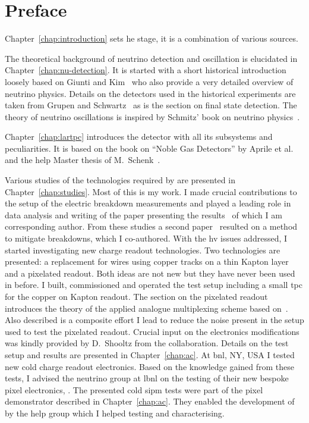 \renewcommand{\Chapter}{{Preface}}
\chapter*{\Chapter}
\chaptermark{\Chapter}


Chapter~\ref{chap:introduction} sets he stage, it is a combination of various sources.

The theoretical background of neutrino detection and oscillation is elucidated in Chapter~\ref{chap:nu-detection}.
It is started with a short historical introduction loosely based on Giunti and Kim~\cite{giunti} who also provide a very detailed overview of neutrino physics.
Details on the detectors used in the historical experiments are taken from Grupen and Schwartz~\cite{grupen} as is the section on final state detection.
The theory of neutrino oscillations is inspired by Schmitz' book on neutrino physics~\cite{schmitz}.

Chapter~\ref{chap:lartpc} introduces the \lartpc{} detector with all its subsystems and peculiarities.
It is based on the book on ``Noble Gas Detectors'' by Aprile et al.~\cite{NobleGasDetectors} and the \gls{help} Master thesis of M.\ Schenk~\cite{michu}.

Various studies of the technologies required by \AC{} are presented in Chapter~\ref{chap:studies}.
Most of this is my work.
I made crucial contributions to the setup of the electric breakdown measurements and played a leading role in data analysis and writing of the paper presenting the results~\cite{breakdown_16} of which I am corresponding author.
From these studies a second paper~\cite{latex} resulted on a method to mitigate breakdowns, which I co-authored.
With the \gls{hv} issues addressed, I started investigating new charge readout technologies.
Two technologies are presented: a replacement for wires using copper tracks on a thin Kapton layer and a pixelated readout.
Both ideas are not new but they have never been used in \lar{} before.
I built, commissioned and operated the test setup including a small \gls{tpc} for the copper on Kapton readout.
The section on the pixelated readout introduces the theory of the applied analogue multiplexing scheme based on~\cite{maplesyrup}.
Also described is a composite effort I lead to reduce the noise present in the setup used to test the pixelated readout.
Crucial input on the electronics modifications was kindly provided by D.\ Shooltz from the \lariat{} collaboration.
Details on the test setup and results are presented in Chapter~\ref{chap:ac}.
At \gls{bnl}, NY, USA I tested new cold charge readout electronics.
Based on the knowledge gained from these tests, I advised the neutrino group at \gls{lbnl} on the testing of their new bespoke pixel electronics, \larpix{}.
The presented cold \gls{sipm} tests were part of the pixel demonstrator described in Chapter~\ref{chap:ac}.
They enabled the development of \AL{} by the \gls{help} \lar{} group which I helped testing and characterising.

